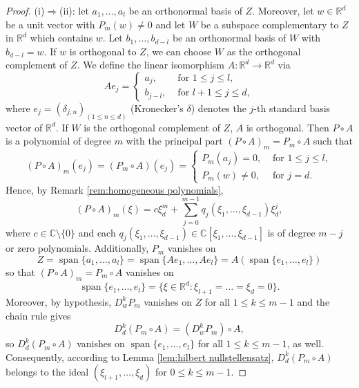 \documentclass[a4paper,10pt]{amsart}
\newtheorem*{crucial lemma}{Lemma \ref{lem:nice polynomial2}}
\theoremstyle{definition}
\newcommand{\R}{\mathbb{R}}
\newcommand{\C}{\mathbb{C}}
\begin{document}
\begin{proof} (i)$\Rightarrow$(ii):
	let $a_1,\ldots,a_l$ be an orthonormal basis of $Z$. Moreover, let $w\in\R^d$ be a unit vector with $P_m(w)\neq 0$ and let $W$ be a subspace complementary to $Z$ in $\R^d$ which contains $w$. Let $b_1,\ldots,b_{d-l}$ be an orthonormal basis of $W$ with $b_{d-l}=w$. If $w$ is orthogonal to $Z$, we can choose $W$ as the orthogonal complement of $Z$. We define the linear isomorphism $A:\R^d\rightarrow\R^d$ via
	\[A e_j=\begin{cases}
		a_j,& \text{ for }1\leq j\leq l,\\ b_{j-l},& \text{ for }l+1\leq j\leq d,
	\end{cases}\]
	where $e_j=(\delta_{j,n})_{(1\leq n\leq d)}$ (Kronecker's $\delta$) denotes the $j$-th standard basis vector of $\R^d$. If $W$ is the orthogonal complement of $Z$, $A$ is orthogonal. Then $P\circ A$ is a polynomial of degree $m$ with the principal part $(P\circ A)_m=P_m\circ A$ such that
	\[(P\circ A)_m(e_j)=(P_m\circ A)(e_j)=\begin{cases}
		P_m(a_j)=0,& \text{ for }1\leq j\leq l,\\ P_m(w)\neq 0,& \text{ for }j=d.
	\end{cases}\]
	Hence, by Remark \ref{rem:homogeneous polynomials}, 
	\begin{equation}\label{eq:decomposition 4}
		(P\circ A)_m(\xi)=c\xi_d^m+\sum_{j=0}^{m-1}q_j(\xi_1,\ldots,\xi_{d-1})\xi_d^j,
	\end{equation}
	where $c\in\C\setminus\{0\}$ and each $q_j(\xi_1,\ldots,\xi_{d-1})\in\C[\xi_1,\ldots,\xi_{d-1}]$ is of degree $m-j$ or zero polynomials.
	Additionally, $P_m$ vanishes on
	\[Z=\operatorname{span}\{a_1,\ldots,a_l\}=\operatorname{span}\{A e_1,\ldots,A e_l\}=A\left(\operatorname{span}\{e_1,\ldots,e_l\}\right)\]
	so that $(P\circ A)_m=P_m\circ A$ vanishes on
	\[\operatorname{span}\{e_1,\ldots,e_l\}=\{\xi\in\R^d\colon \xi_{l+1}=\ldots=\xi_d=0\}.\]
Moreover, by hypothesis, $D^k_w P_m$ vanishes on $Z$ for all $1\leq k\leq m-1$ and the chain rule gives
\begin{equation}\label{eq:D_d^k(P_m circ A}
D_d^k(P_m\circ A)=(D^k_w P_m)\circ A,
\end{equation}
so $D_d^k(P_m\circ A)$ vanishes on $\operatorname{span}\{e_1,\ldots,e_l\}$ for all $1\leq k\leq m-1$, as well. Consequently, according to Lemma \ref{lem:hilbert nullstellensatz}, $D_d^k(P_m\circ A)$ belongs to the ideal $(\xi_{l+1},\ldots,\xi_d)$ for $0\leq k\leq m-1$.



\end{proof}
\end{document}
